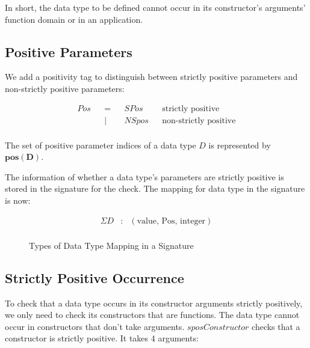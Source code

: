 In short, the data type to be defined cannot occur in its constructor's arguments' function domain or in an application.

\subsection{Positive Parameters}

We add a positivity tag to distinguish between strictly positive parameters and non-strictly positive parameters:

\begin{figure}[H]
  \begin{equation*}
    \begin{aligned}
      Pos &  & = &  & SPos  &  & \textrm{strictly positive}     \\
          &  & | &  & NSpos &  & \textrm{non-strictly positive} \\
    \end{aligned}
  \end{equation*}
\end{figure}

The set of positive parameter indices of a data type $D$ is represented by $\boldsymbol{pos(D)}$.

The information of whether a data type's parameters are strictly positive is stored in the signature for the check. The mapping for data type in the signature is now:

\begin{figure}[H]
  \begin{equation*}
    \begin{aligned}
      \Sigma D & : & (\textrm{value, Pos, integer}) \\
    \end{aligned}
  \end{equation*}
  \caption{Types of Data Type Mapping in a Signature}
\end{figure}

\subsection{Strictly Positive Occurrence}

To check that a data type occurs in its constructor arguments strictly positively, we only need to check its constructors that are functions. The data type cannot occur in constructors that don't take arguments. $sposConstructor$ checks that a constructor is strictly positive. It takes 4 arguments:

